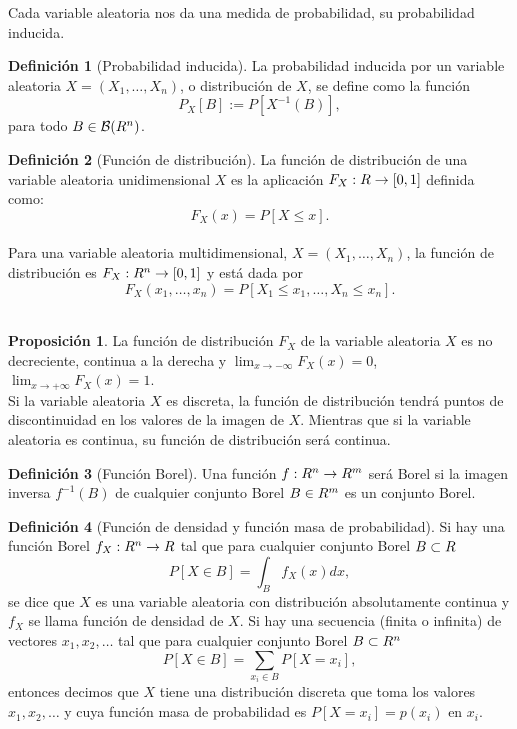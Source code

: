 \documentclass[12pt,a4paper]{report} %
\let\mathbb\relax
\theoremstyle{definition}
\newtheorem{definition}{Definición}[section]
\newtheorem{proposition}[theorem]{Proposición}
\begin{document}
Cada variable aleatoria nos da una medida de probabilidad, su probabilidad inducida.\\

\begin{definition}[Probabilidad inducida]
  La probabilidad inducida por un variable aleatoria $X=(X_1,\dots, X_n)$, o distribución de $X$, se define como la función \[
P_X[B]:= P[X^{-1}(B)],
  \]
para todo $B \in \mathcal{B}(\mathbb{R}^n)$.\\
\end{definition}

\begin{definition}[Función de distribución]
  La función de distribución de una variable aleatoria unidimensional $X$ es la aplicación $F_X:\mathbb{R}\to[0,1]$ definida como:\[
F_X(x) = P[X\leq x].
  \]\\[-5pt]
Para una variable aleatoria multidimensional,  $X=(X_1,\dots,X_n)$, la función de distribución es $F_X:\mathbb{R}^n\to[0,1]$ y está dada por\[
F_X(x_1,\dots,x_n) = P[X_1\leq x_1,\dots, X_n\leq x_n].
  \]\\[-10pt]
\end{definition}

\begin{proposition}
  La función de distribución $F_X$ de la variable aleatoria $X$ es no decreciente, continua a la derecha y $\lim_{x\to - \infty}F_X(x) = 0$, $\lim_{x\to +\infty}F_X(x) = 1$.\\
  
  Si la variable aleatoria $X$ es discreta, la función de distribución tendrá puntos de discontinuidad en los valores de la imagen de $X$. Mientras que si la variable aleatoria es continua, su función de distribución será continua.\\
\end{proposition}

\begin{definition}[Función Borel]
  Una función $f:\mathbb{R}^n\to \mathbb{R}^m$ será Borel si la imagen inversa $f^{-1}(B)$ de cualquier conjunto Borel $B\in \mathbb{R}^m$ es un conjunto Borel.\\
\end{definition}

\begin{definition}[Función de densidad y función masa de probabilidad]
  Si hay una función Borel $f_X:\mathbb{R}^n\to \mathbb{R}$ tal que para cualquier conjunto Borel $B\subset \mathbb{R}$\[
P[X\in B] = \int_B f_X(x) dx,
\]
se dice que $X$ es una variable aleatoria con distribución absolutamente continua y $f_X$ se llama función de densidad de $X$. Si hay una secuencia (finita o infinita) de vectores $x_1,x_2,\dots$ tal que para cualquier conjunto Borel $B\subset \mathbb{R}^n$\[
P[X\in B] = \sum_{x_i\in B}P[X = x_i],
\]
entonces decimos que $X$ tiene una distribución discreta que toma los valores $x_1,x_2,\dots$ y cuya función masa de probabilidad es $P[X=x_i]=p(x_i)$ en $x_i$.\\
\end{definition}
\end{document}
